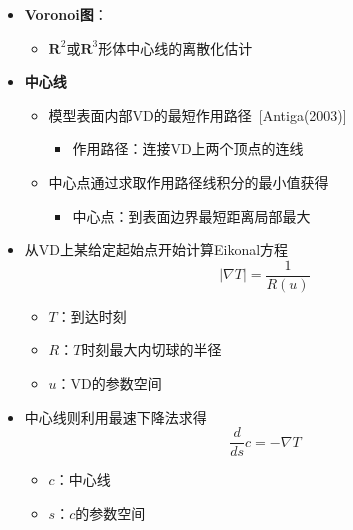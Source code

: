 \begin{frame}
\begin{itemize}
\item \textbf{Voronoi图}：
\begin{itemize}
\item $\mathbf{R}^2$或$\mathbf{R}^3$形体中心线的离散化估计
\end{itemize}
\item \textbf{中心线}
\begin{itemize}
\item 模型表面内部VD的最短作用路径~[Antiga(2003)]
\begin{itemize}
\item \alert{作用路径}：连接VD上两个顶点的连线
\end{itemize}
\item 中心点通过求取作用路径线积分的最小值获得
\begin{itemize}
\item \alert{中心点}：到表面边界最短距离局部最大
\end{itemize}
\end{itemize}
\end{itemize}
\end{frame}

\begin{frame}
\begin{itemize}
\item 从VD上某给定起始点开始计算Eikonal方程
\begin{equation*}
\left| \nabla T \right| = \frac{1}{R(u)}
\end{equation*}
\begin{itemize}
\item $T$：到达时刻
\item $R$：$T$时刻最大内切球的半径
\item $u$：VD的参数空间
\end{itemize}
\item 中心线则利用最速下降法求得
\begin{equation*}
\frac{d}{ds} c = - \nabla T
\end{equation*}
\begin{itemize}
\item $c$：中心线
\item $s$：$c$的参数空间
\end{itemize}
\end{itemize}
\end{frame}

